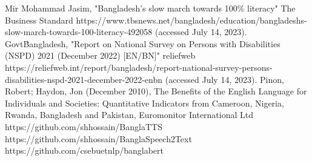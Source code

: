 \begin{thebibliography}{00}
     Mir Mohammad Jasim, "Bangladesh’s slow march towards 100\% literacy" The Business Standard https://www.tbsnews.net/bangladesh/education/bangladeshs-slow-march-towards-100-literacy-492058 (accessed July 14, 2023).
     Govt\. Bangladesh, "Report on National Survey on Persons with Disabilities (NSPD) 2021 (December 2022) [EN/BN]" reliefweb https://reliefweb.int/report/bangladesh/report-national-survey-persons-disabilities-nspd-2021-december-2022-enbn (accessed July 14, 2023).
     Pinon, Robert; Haydon, Jon (December 2010), The Benefits of the English Language for Individuals and Societies: Quantitative Indicators from Cameroon, Nigeria, Rwanda, Bangladesh and Pakistan, Euromonitor International Ltd
     https://github.com/shhossain/BanglaTTS
     https://github.com/shhossain/BanglaSpeech2Text
     https://github.com/csebuetnlp/banglabert
\end{thebibliography}
